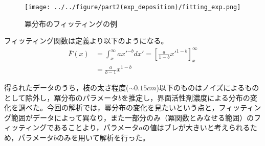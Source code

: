 \documentclass[autodetect-engine,dvi=dvipdfmx,a4paper,ja=standard,oneside,openany,11pt,draft]{bxjsbook}
\begin{document}
\begin{wrapfigure}{r}[0pt]{0.33\textwidth}
  \begin{center}
    \texttt{[image: ../../figure/part2(exp\_deposition)/fitting\_exp.png]}
  \end{center}
  \caption{冪分布のフィッティングの例}
  \label{fig:fitting_exp}
\end{wrapfigure}

フィッティング関数は定義より以下のようになる。
\begin{equation}
  \begin{split}
    \bar{F}(x) & = \int_{x}^{\infty} ax'^{-b}dx' = \left[ \frac{a}{1-b}x'^{1-b} \right]_{x}^{\infty} \\
               & = \frac{a}{b-1}x^{1-b}
  \end{split}
\end{equation}

得られたデータのうち，枝の太さ程度($\sim0.15\si{cm}$)以下のものはノイズによるものとして除外し，冪分布のパラメータ$b$を推定し，界面活性剤濃度による分布の変化を調べた。今回の解析では，冪分布の変化を見たいという点と，フィッティング範囲がデータによって異なり，また一部分のみ（冪関数とみなせる範囲）のフィッティングであることより，パラメータ$a$の値はブレが大きいと考えられるため，パラメータ$b$のみを用いて解析を行った。

\ifdraft{
  
  
}{}
\end{document}
